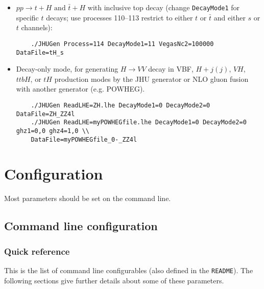 \documentclass[aps,superscriptaddress,nofootinbib]{revtex4}
\begin{document}
\begin{itemize}
	\item $pp \to t+H\text{ and }\bar{t}+H$ with inclusive top decay (change \verb|DecayMode1| for specific $t$ decays; use processes 110--113 restrict to either $t$ or $\bar{t}$ and either $s$ or $t$ channels):
	\begin{verbatim}
	./JHUGen Process=114 DecayMode1=11 VegasNc2=100000 DataFile=tH_s
	\end{verbatim}
	\item Decay-only mode, for generating $H\to VV$ decay in VBF, $H+j(j)$, $VH$, $ttbH$, or $tH$ production
	modes by the JHU generator or NLO gluon fusion with another generator (e.g. POWHEG).
	\begin{verbatim}
	./JHUGen ReadLHE=ZH.lhe DecayMode1=0 DecayMode2=0 DataFile=ZH_ZZ4l
	./JHUGen ReadLHE=myPOWHEGfile.lhe DecayMode1=0 DecayMode2=0 ghz1=0,0 ghz4=1,0 \\
    DataFile=myPOWHEGfile_0-_ZZ4l
	\end{verbatim}
\end{itemize}

\section{Configuration}

Most parameters should be set on the command line.

\subsection{Command line configuration}

\subsubsection{Quick reference}

This is the list of command line configurables (also defined in the \verb|README|).  The following sections give further details about some of these parameters.
\end{document}
